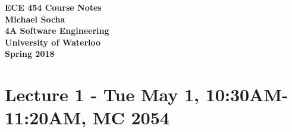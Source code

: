 \documentclass[12pt,titlepage]{article}
\begin{document}
  \begin{titlepage}
    \vspace*{\fill}
    \centering

    \textbf{\Huge ECE 454 Course Notes} \\ [1em]
    \textbf{\Large Michael Socha} \\ [1em]
    \textbf{\large 4A Software Engineering} \\
    \textbf{\large University of Waterloo} \\
    \textbf{\large Spring 2018} \\
    \vspace*{\fill}
  \end{titlepage}

  \newpage 

  \section*{Lecture 1 - Tue May 1, 10:30AM-11:20AM, MC 2054}
\end{document}

